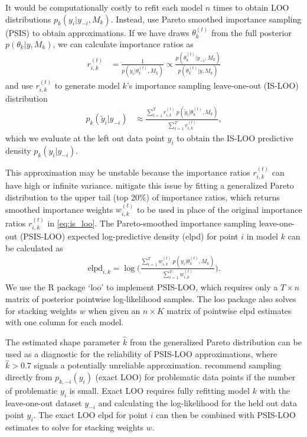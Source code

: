 \documentclass[12pt]{article}   	%
\numberwithin{equation}{section}
\begin{document}
It would be computationally costly to refit each model $n$ times to obtain LOO distributions $p_{k}(y_i \vert y_{-i}, M_k)$. Instead, \citet{yao2018stacking} use Pareto smoothed importance sampling (PSIS) \citep{vehtari2017psis} to obtain approximations. If we have draws $\theta_k^{(t)}$ from the full posterior $p(\theta_k \vert y, M_k)$, we can calculate importance ratios as
\begin{align}
r_{i,k}^{(t)} &= \frac{1}{p(y_i \vert \theta_k^{(t)}, M_k)} \propto \frac{p(\theta_k^{(t)} \vert y_{-i}, M_k)}{p(\theta_k^{(t)} \vert y, M_k)} \label{eq:imporance_ratio}
\end{align}
and use $r_{i,k}^{(t)}$ to generate model $k$'s importance sampling leave-one-out (IS-LOO) distribution 
\begin{align}
p_k(\tilde{y}_i \vert y_{-i}) &\approx \frac{\sum_{t = 1}^T r_{i, k}^{(t)} \: p(\tilde{y}_i \vert \theta_k^{(t)}, M_k)}{\sum_{t=1}^T r_{i, k}^{(t)}}, \label{eq:is_loo}
\end{align}
which we evaluate at the left out data point $y_i$ to obtain the IS-LOO predictive density $p_k(y_i \vert y_{-i})$. 

This approximation may be unstable because the importance ratios $r_{i,k}^{(t)}$ can have high or infinite variance. \citet{vehtari2017psis} mitigate this issue by fitting a generalized Pareto distribution to the upper tail (top 20\%) of importance ratios, which returns smoothed importance weights $w_{i,k}^{(t)}$ to be used in place of the original importance ratios $r_{i,k}^{(t)}$ in \eqref{eq:is_loo}. The Pareto-smoothed importance sampling leave-one-out (PSIS-LOO) expected log-predictive density (elpd) for point $i$ in model $k$ can be calculated as
\begin{align}
\text{elpd}_{i,k} = \log \Bigg( \frac{\sum_{t=1}^T w_{i,k}^{(t)} \: p(y_i \vert \theta_k^{(t)}, M_k)}{\sum_{t=1}^T w_{i,k}^{(t)}} \Bigg). \label{eq:elpd_loo}
\end{align}
We use the R package `loo' \citep{vehtari2020loo} to implement PSIS-LOO, which requires only a $T \times n$ matrix of posterior pointwise log-likelihood samples. The loo package also solves for stacking weights $w$ when given an $n \times K$ matrix of pointwise elpd estimates with one column for each model. 

The estimated shape parameter $\hat{k}$ from the generalized Pareto distribution can be used as a diagnostic for the reliability of PSIS-LOO approximations, where $\hat{k} > 0.7$ signals a potentially unreliable approximation. \citet{vehtari2017psis} recommend sampling directly from $p_{k, -i}(y_i)$ (exact LOO) for problematic data points if the number of problematic $y_i$ is small. Exact LOO requires fully refitting model $k$ with the leave-one-out dataset $y_{-i}$ and calculating the log-likelihood for the held out data point $y_i$. The exact LOO elpd for point $i$ can then be combined with PSIS-LOO estimates to solve for stacking weights $w$. 
\end{document}
